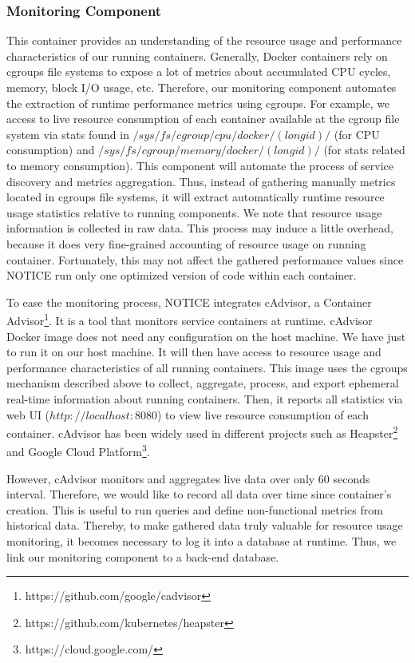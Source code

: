 \subsubsection{Monitoring Component}
This container provides an understanding of the resource usage and performance characteristics of our running containers. Generally, Docker containers rely on cgroups file systems to expose a lot of metrics about accumulated CPU cycles, memory, block I/O usage, etc. Therefore, our monitoring component automates the extraction of runtime performance metrics using cgroups. For example, we access to live resource consumption of each container available at the cgroup file system via stats found in $/sys/fs/cgroup/cpu/docker/(longid)/$ (for CPU consumption) and $/sys/fs/cgroup/memory/docker/(longid)/$ (for stats related to memory consumption). This component will automate the process of service discovery and metrics aggregation. Thus, instead of gathering manually metrics located in cgroups file systems, it will extract automatically runtime resource usage statistics relative to running components. We note that resource usage information is collected in raw data. This process may induce a little overhead, because it does very fine-grained accounting of resource usage on running container. Fortunately, this may not affect the gathered performance values since NOTICE run only one optimized version of code within each container.

To ease the monitoring process, NOTICE integrates cAdvisor, a Container Advisor\footnote{https://github.com/google/cadvisor}. It is a tool that monitors service containers at runtime. 
cAdvisor Docker image does not need any configuration on the host machine. We have just to run it on our host machine. It will then have access to resource usage and performance characteristics of all running containers. This image uses the cgroups mechanism described above to collect, aggregate, process, and export ephemeral real-time information about running containers. Then, it reports all statistics via web UI ($http://localhost:8080$) to view live resource consumption of each container. cAdvisor has been widely used in different projects such as Heapster\footnote{https://github.com/kubernetes/heapster} and Google Cloud Platform\footnote{https://cloud.google.com/}.

However, cAdvisor monitors and aggregates live data over only 60 seconds interval. Therefore, we would like to record all data over time since container's creation. This is useful to run queries and define non-functional metrics from historical data. Thereby, to make gathered data truly valuable for resource usage monitoring, it becomes necessary to log it into a database at runtime. Thus, we link our monitoring component to a back-end database. 
